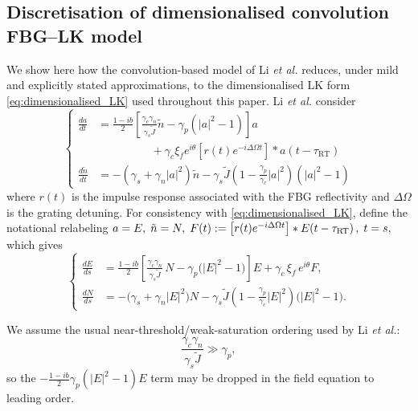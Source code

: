 \subsection{Discretisation of dimensionalised convolution FBG–LK model}
\label{app:Li_chaos_nondim}
%
We show here how the convolution-based model of Li \textit{et al.} \cite{li2012distributed,li2015chaotic,li2020stable} reduces, under mild and explicitly stated approximations, to the dimensionalised LK form \eqref{eq:dimensionalised_LK} used throughout this paper.
%
Li \textit{et al.} consider
%
\begin{equation} 
    \left\{ 
        \begin{aligned} \frac{d a}{d t} &= \frac{1-i b}{2} \left[\frac{\gamma_{c} \gamma_{n}}{\gamma_{s} \tilde{J}} \tilde{n} - \gamma_{p}\left(|a|^{2}-1\right)\right] a \\ 
            &\hspace{2cm} + \gamma_{c} \xi_{f} e^{i \theta} \left[r(t) e^{-i \Delta \Omega t}\right] * a\!\left(t-\tau_\text{RT}\right) \\ 
            \frac{d \tilde{n}}{d t} &= -\left(\gamma_{s}+\gamma_{n}|a|^{2}\right) \tilde{n} - \gamma_{s} \tilde{J}\left(1-\frac{\gamma_{p}}{\gamma_{c}}|a|^{2}\right) \left(|a|^{2}-1\right) 
        \end{aligned} \right. 
\end{equation}
%
where $r(t)$ is the impulse response associated with the FBG reflectivity and $\Delta\Omega$ is the grating detuning. 
For consistency with \eqref{eq:dimensionalised_LK}, define the notational relabeling
$
a=E,\; \tilde{n}=N,\;
F(t):=\big[r(t)e^{-i\Delta\Omega t}\big]*E\!\left(t-\tau_{\rm RT}\right),\; t=s,
$
 which gives
\begin{equation}
\label{eq:Li_rewritten}
\left\{
\begin{aligned}
\frac{d E}{d s} &= \frac{1-ib}{2}
\left[\frac{\gamma_{c}\gamma_{n}}{\gamma_{s}\tilde{J}}\,N
      -\gamma_{p}\big(|E|^{2}-1\big)\right]E
+ \gamma_{c}\,\xi_{f}\, e^{i\theta} F, \\
\frac{d N}{d s} &= -\big(\gamma_{s}+\gamma_{n}|E|^{2}\big) N
   - \gamma_{s}\tilde{J}\!\left(1-\frac{\gamma_{p}}{\gamma_{c}}|E|^{2}\right)\!\big(|E|^{2}-1\big).
\end{aligned}
\right.
\end{equation}
%
\par
%
We assume the usual near-threshold/weak-saturation ordering used by Li \textit{et al.}:
%
\[
\frac{\gamma_{c}\gamma_{n}}{\gamma_{s}\tilde{J}} \gg \gamma_{p},
\]
so the $-\tfrac{1-ib}{2}\gamma_p(|E|^2-1)E$ term may be dropped in the field equation to leading order. 
